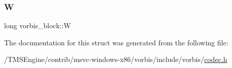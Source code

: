 \mbox{\label{structvorbis__block_a1e420440dd6a5a39262c0fe7afa8435a}} 
\subsubsection{\texorpdfstring{W}{W}}
{\footnotesize\ttfamily long vorbis\+\_\+block\+::W}



The documentation for this struct was generated from the following file\+:\begin{DoxyCompactItemize}
\item 
/\+T\+M\+S\+Engine/contrib/msvc-\/windows-\/x86/vorbis/include/vorbis/\hyperlink{codec_8h}{codec.\+h}\end{DoxyCompactItemize}

